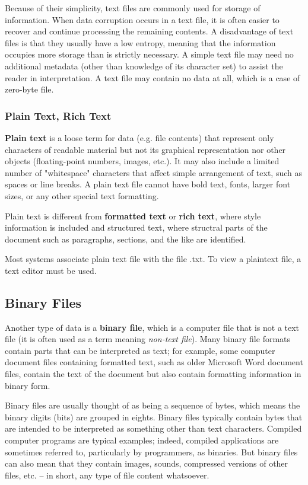 \documentclass{article}
\begin{document}
  Because of their simplicity, text files are commonly used for storage of information. When data corruption occurs in a text file, it is often easier to recover and continue processing the remaining contents. A disadvantage of text files is that they usually have a low entropy, meaning that the information occupies more storage than is strictly necessary. A simple text file may need no additional metadata (other than knowledge of its character set) to assist the reader in interpretation. A text file may contain no data at all, which is a case of zero-byte file.

  \subsubsection{Plain Text, Rich Text}
  \textbf{Plain text} is a loose term for data (e.g. file contents) that represent only characters of readable material but not its graphical representation nor other objects (floating-point numbers, images, etc.). It may also include a limited number of "whitespace" characters that affect simple arrangement of text, such as spaces or line breaks. A plain text file cannot have bold text, fonts, larger font sizes, or any other special text formatting. 

  Plain text is different from \textbf{formatted text} or \textbf{rich text}, where style information is included and structured text, where structral parts of the document such as paragraphs, sections, and the like are identified. 

  Most systems associate plain text file with the file .txt. To view a plaintext file, a text editor must be used. 

  \subsection{Binary Files}
  Another type of data is a \textbf{binary file}, which is a computer file that is not a text file (it is often used as a term meaning \textit{non-text file}). Many binary file formats contain parts that can be interpreted as text; for example, some computer document files containing formatted text, such as older Microsoft Word document files, contain the text of the document but also contain formatting information in binary form.

  Binary files are usually thought of as being a sequence of bytes, which means the binary digits (bits) are grouped in eights. Binary files typically contain bytes that are intended to be interpreted as something other than text characters. Compiled computer programs are typical examples; indeed, compiled applications are sometimes referred to, particularly by programmers, as binaries. But binary files can also mean that they contain images, sounds, compressed versions of other files, etc. – in short, any type of file content whatsoever.
\end{document}
